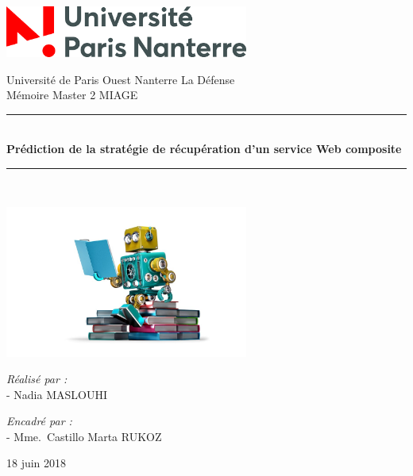 \documentclass[a4paper,12pt]{book}
\makeatletter
\def\cleardoublepage{\clearpage\if@twoside \ifodd\c@page\else%
  \hbox{}%
  \thispagestyle{empty}%
  \newpage%
  \if@twocolumn\hbox{}\newpage\fi\fi\fi}
\theoremstyle{break}
\makeatother
\begin{document}
\let\cleardoublepage\clearpage


\begin{titlepage}
\begin{center}
\includegraphics[width=0.6\textwidth]{images/univ.png}

\vfill

{\large Université de Paris Ouest Nanterre La Défense}\\[0.7cm]

{\large Mémoire Master 2 MIAGE}\\[0.7cm]



\rule{\linewidth}{0.5mm} \\[0.4cm]
{ \huge \bfseries Prédiction de la stratégie de récupération d'un service Web composite\\[0.4cm] }
\rule{\linewidth}{0.5mm} \\[1.5cm]

\vfill
\vfill
\vfill

\includegraphics[width=0.6\textwidth]{images/ML.jpg}


\noindent
\begin{minipage}{0.7\textwidth}
  \large
    \emph{Réalisé par :}\\
- Nadia \textsc{MASLOUHI}\\
\end{minipage}%
\begin{minipage}{0.7\textwidth}
   \large
    \emph{Encadré par :} \\
- Mme.~Castillo Marta \textsc{RUKOZ}
\end{minipage}

\vfill
\vfill
\vfill
\vfill
\vfill
\vfill
\large{ 18 juin 2018}


\end{center}
\end{titlepage}
\clearpage
\end{document}
